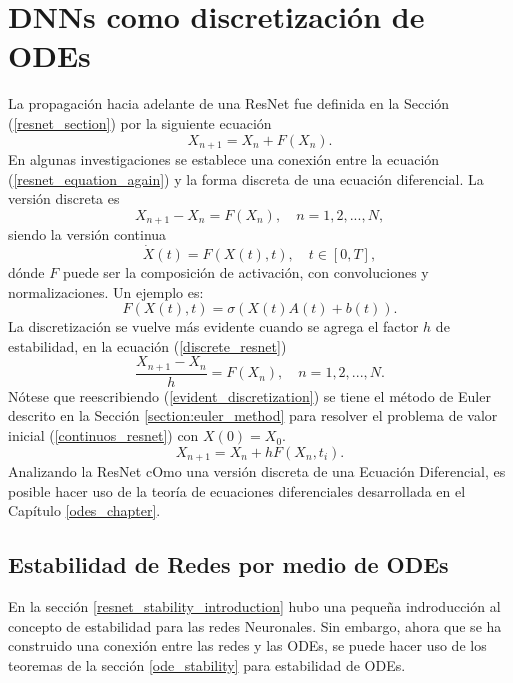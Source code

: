 \section{DNNs como discretización de ODEs}
La propagación hacia adelante de una ResNet fue definida en la Sección (\ref{resnet_section}) por la siguiente ecuación
\begin{equation} 
   \label{resnet_equation_again}
   X_{n+1} = X_n + F(X_n).
\end{equation}
En algunas investigaciones \cite{DBLP:journals/corr/LiaoP16, dnns_motivated_by_pdes, numerical_ode_and_architectures} se establece una conexión entre la ecuación (\ref{resnet_equation_again}) y la forma discreta de una ecuación diferencial. La versión discreta es
\begin{equation} 
   \label{discrete_resnet}
   X_{n+1} -X_n =  F(X_n), \quad n=1,2,...,N,
\end{equation}
siendo la versión continua 
\begin{equation}
   \label{continuos_resnet}
   \dot X(t) = F(X(t),t), \quad t\in [0,T], 
\end{equation}
dónde $F$ puede ser la composición de activación, con convoluciones y normalizaciones. Un ejemplo es: 
\begin{equation}
   \label{example_of_f}
   F(X(t), t) = \sigma(X(t)A(t) + b(t)).
\end{equation}
La discretización se vuelve más evidente cuando se agrega el factor $h$ de estabilidad, en la ecuación (\ref{discrete_resnet})
\begin{equation} 
   \label{evident_discretization}
   \frac{X_{n+1} -X_n}{h} =  F(X_n), \quad n=1,2,...,N.
\end{equation}
Nótese que reescribiendo (\ref{evident_discretization}) se tiene el método de Euler descrito en la Sección \ref{section:euler_method} para resolver el problema de valor inicial (\ref{continuos_resnet}) con $X(0) = X_0$.
\begin{equation}
   X_{n+1} = X_n + hF(X_n, t_i).
\end{equation}
Analizando la ResNet cOmo una versión discreta de una Ecuación Diferencial, es posible hacer uso de la teoría de ecuaciones diferenciales desarrollada en el Capítulo \ref{odes_chapter}.
\subsection{Estabilidad de Redes por medio de ODEs}
En la sección \ref{resnet_stability_introduction} hubo una pequeña indroducción al concepto de estabilidad para las redes Neuronales. Sin embargo, ahora que se ha construido una conexión entre las redes y las ODEs, se puede hacer uso de los teoremas de la sección \ref{ode_stability} para estabilidad de ODEs.

